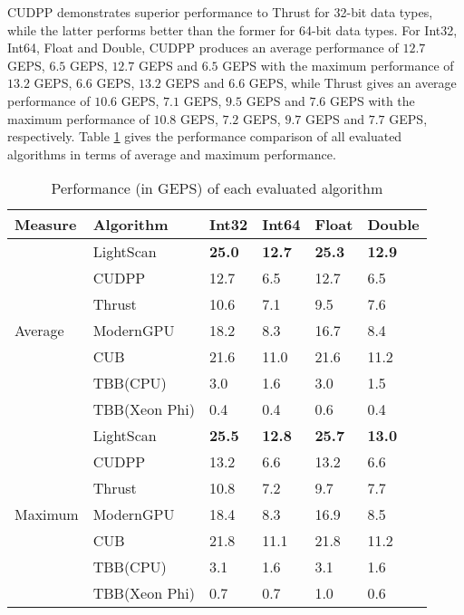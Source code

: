\documentclass[article]{elsarticle}
\begin{document}
{CUDPP demonstrates superior performance to Thrust for 32-bit data types, while the latter performs better than the former for 64-bit data types. For Int32, Int64, Float and Double, CUDPP produces an average performance of $12.7$ GEPS, $6.5$ GEPS, $12.7$ GEPS and $6.5$ GEPS with the maximum performance of $13.2$ GEPS, $6.6$ GEPS, $13.2$ GEPS and $6.6$ GEPS, while Thrust gives an average performance of $10.6$ GEPS, $7.1$ GEPS, $9.5$ GEPS and $7.6$ GEPS with the maximum performance of $10.8$ GEPS, $7.2$ GEPS, $9.7$ GEPS and $7.7$ GEPS, respectively. Table \ref{tab:gpu_others} gives the performance comparison of all evaluated algorithms in terms of average and maximum performance.
\begin{table}[!h]
\centering
\caption{Performance (in GEPS) of each evaluated algorithm} 
\label{tab:gpu_others}
\begin{tabular}{|l||l||l||l||l||l|}
\hline
\textbf{Measure}&	\textbf{Algorithm}&	\textbf{Int32}&	\textbf{Int64}&	\textbf{Float}&	\textbf{Double}\\
\hline
\multirow{7}{*}{Average}
&	LightScan&	\textbf{25.0}&	\textbf{12.7}&	\textbf{25.3}&	\textbf{12.9}\\
\hhline{~-----}
&	CUDPP&	12.7&	6.5&	12.7&	6.5\\
\hhline{~-----}
&	Thrust&	10.6&	7.1&	9.5&	7.6\\
\hhline{~-----}
&	ModernGPU&	18.2&	8.3&	16.7&	8.4\\
\hhline{~-----}
&	CUB&	21.6&	11.0&	21.6&	11.2\\
\hhline{~-----}
&	TBB(CPU)&	3.0&	1.6&	3.0&	1.5\\
\hhline{~-----}
&	TBB(Xeon Phi)&	0.4&	0.4&	0.6&	0.4\\
\hline
\multirow{7}{*}{Maximum}
&	LightScan&	\textbf{25.5}&	\textbf{12.8}&	\textbf{25.7}&	\textbf{13.0}\\
\hhline{~-----}
&	CUDPP&	13.2&	6.6&	13.2&	6.6\\
\hhline{~-----}
&	Thrust&	10.8&	7.2&	9.7&	7.7\\
\hhline{~-----}
&	ModernGPU&	18.4&	8.3&	16.9&	8.5\\
\hhline{~-----}
&	CUB&	21.8&	11.1&	21.8&	11.2\\
\hhline{~-----}
&	TBB(CPU)&	3.1&	1.6&	3.1&	1.6\\
\hhline{~-----}
&	TBB(Xeon Phi)&	0.7&	0.7&	1.0&	0.6\\
\hline
\end{tabular}
\end{table}

}
\end{document}
